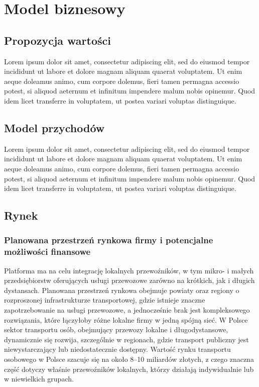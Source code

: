 \chapter{Model biznesowy}
\label{chap:drugi}



\section{Propozycja wartości}

Lorem ipsum dolor sit amet, consectetur adipiscing elit, sed do eiusmod tempor incididunt ut labore et dolore magnam aliquam quaerat voluptatem. Ut enim aeque doleamus animo, cum corpore dolemus, fieri tamen permagna accessio potest, si aliquod aeternum et infinitum impendere malum nobis opinemur. Quod idem licet transferre in voluptatem, ut postea variari voluptas distinguique.

\section{Model przychodów}

Lorem ipsum dolor sit amet, consectetur adipiscing elit, sed do eiusmod tempor incididunt ut labore et dolore magnam aliquam quaerat voluptatem. Ut enim aeque doleamus animo, cum corpore dolemus, fieri tamen permagna accessio potest, si aliquod aeternum et infinitum impendere malum nobis opinemur. Quod idem licet transferre in voluptatem, ut postea variari voluptas distinguique.

\section{Rynek}
\subsection{Planowana przestrzeń rynkowa firmy i potencjalne możliwości finansowe}
Platforma ma na celu integrację lokalnych przewoźników, w tym mikro- i małych przedsiębiorstw oferujących usługi przewozowe zarówno na krótkich, jak i długich dystansach. Planowana przestrzeń rynkowa obejmuje powiaty oraz regiony o rozproszonej infrastrukturze transportowej, gdzie istnieje znaczne zapotrzebowanie na usługi przewozowe, a jednocześnie brak jest kompleksowego rozwiązania, które łączyłoby różne lokalne firmy w jedną spójną sieć.
W Polsce sektor transportu osób, obejmujący przewozy lokalne i długodystansowe, dynamicznie się rozwija, szczególnie w regionach, gdzie transport publiczny jest niewystarczający lub niedostatecznie dostępny. Wartość rynku transportu osobowego w Polsce szacuje się na około 8–10 miliardów złotych, z czego znaczna część dotyczy właśnie przewoźników lokalnych, którzy działają indywidualnie lub w niewielkich grupach.

